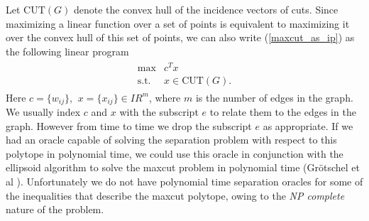 \documentclass[12pt]{article}
\newcommand{\real}{I\!\!R}
\begin{document}
Let $\mbox{CUT}(G)$ denote the convex hull of the incidence
vectors of cuts. Since maximizing a linear function over a set of
points is equivalent to maximizing it over the convex hull of this
set of points, we can also write (\ref{maxcut_as_ip}) as the
following linear program
\begin{eqnarray}
\label{maxcut_as_01lp}
\begin{array}{cc}
\max & c^Tx \\
\mbox{s.t.} & x \in \mbox{CUT}(G).
\end{array}
\end{eqnarray}
Here $c = \{w_{ij} \}, \,\ x = \{x_{ij}\} \in \real^m$, where $m$
is the number of edges in the graph. We usually index $c$ and $x$
with the subscript $e$ to relate them to the edges in the graph.
However from time to time we drop the subscript $e$ as
appropriate. If we had an oracle capable of solving the separation
problem with respect to this polytope in polynomial time, we could
use this oracle in conjunction with the ellipsoid algorithm to
solve the maxcut problem in polynomial time (Gr\"otschel et al
\cite{GLSbook}). Unfortunately we do not have polynomial time
separation oracles for some of the inequalities that describe the
maxcut polytope, owing to the {\em NP complete} nature of the
problem.
\end{document}
